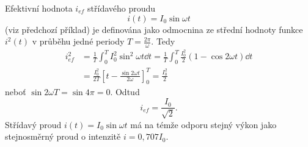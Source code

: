 \begin{mdframed}[style=mdexam]
  \begin{example}\label{mai:exam101}
    Efektivní hodnota $i_{ef}$ střídavého proudu $$i(t) = I_0\sin\omega t$$ (viz
    předchozí příklad) je definována jako odmocnina ze střední hodnoty funkce $i^2(t)$ v průběhu
    jedné periody $T = \frac{2\pi}{\omega}$. Tedy
    \begin{align*}
      i_{ef}^2 &= \frac{1}{T}\int_0^T I_0^2\sin^2\omega t\dd{t} = 
                  \frac{1}{T}\int_0^T \frac{I_0^2}{2}(1- \cos2\omega t)\dd{t}           \\
               &= \frac{I_0^2}{2T}
                  \left[
                    t-\frac{\sin2\omega t}{2\omega}
                  \right]_0^T = \frac{I_0^2}{2}
    \end{align*}
    neboť $\sin2\omega T=\sin4\pi = 0.$ Odtud $$i_{ef} = \frac{I_0}{\sqrt{2}}.$$ Střídavý proud
    $i(t) = I_0\sin\omega t$ má na témže odporu stejný výkon jako stejnosměrný proud o intenzitě
    $i = 0,707I_0$.
  \end{example}
\end{mdframed}
















